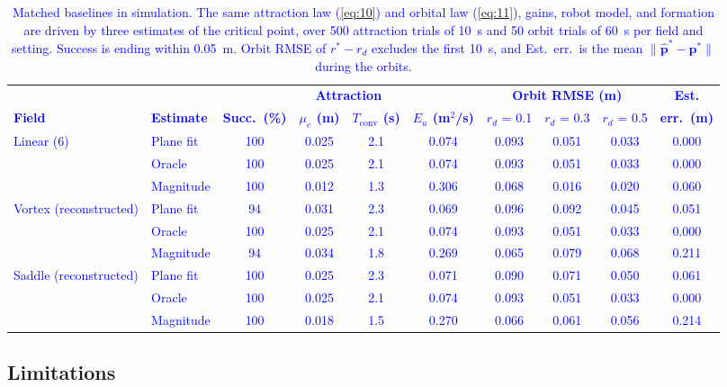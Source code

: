 \documentclass[lettersize,journal]{IEEEtran}
\newcommand{\rev}[1]{\textcolor{blue}{#1}}           %
\begin{document}
\begin{table}[!t]
\centering
\footnotesize
\caption{Matched baselines in simulation. The same attraction law (\ref{eq:10}) and orbital law (\ref{eq:11}), gains, robot model, and formation are driven by three estimates of the critical point, over 500 attraction trials of 10~s and 50 orbit trials of 60~s per field and setting. Success is ending within 0.05~m. Orbit RMSE of $r^* - r_d$ excludes the first 10~s, and Est.\ err.\ is the mean $\|\hat{\mathbf{p}}^* - \mathbf{p}^*\|$ during the orbits.}
\label{tab:baselines}
\setlength{\tabcolsep}{4pt}
\rev{\begin{tabular}{llcccc|ccc|c}
\hline
 & & \multicolumn{4}{c|}{\textbf{Attraction}} & \multicolumn{3}{c|}{\textbf{Orbit RMSE (m)}} & \textbf{Est.} \\
\textbf{Field} & \textbf{Estimate} & \textbf{Succ.\ (\%)} & \textbf{$\mu_e$ (m)} & \textbf{$T_{\mathrm{conv}}$ (s)} & \textbf{$E_u$ (m$^2$/s)} & $r_d$ = 0.1 & $r_d$ = 0.3 & $r_d$ = 0.5 & \textbf{err.\ (m)} \\
\hline
Linear (6) & Plane fit & 100 & 0.025 & 2.1 & 0.074 & 0.093 & 0.051 & 0.033 & 0.000 \\
 & Oracle & 100 & 0.025 & 2.1 & 0.074 & 0.093 & 0.051 & 0.033 & 0.000 \\
 & Magnitude & 100 & 0.012 & 1.3 & 0.306 & 0.068 & 0.016 & 0.020 & 0.060 \\
\hline
Vortex (reconstructed) & Plane fit & 94 & 0.031 & 2.3 & 0.069 & 0.096 & 0.092 & 0.045 & 0.051 \\
 & Oracle & 100 & 0.025 & 2.1 & 0.074 & 0.093 & 0.051 & 0.033 & 0.000 \\
 & Magnitude & 94 & 0.034 & 1.8 & 0.269 & 0.065 & 0.079 & 0.068 & 0.211 \\
\hline
Saddle (reconstructed) & Plane fit & 100 & 0.025 & 2.3 & 0.071 & 0.090 & 0.071 & 0.050 & 0.061 \\
 & Oracle & 100 & 0.025 & 2.1 & 0.074 & 0.093 & 0.051 & 0.033 & 0.000 \\
 & Magnitude & 100 & 0.018 & 1.5 & 0.270 & 0.066 & 0.061 & 0.056 & 0.214 \\
\hline
\end{tabular}} %
\end{table}

\subsection{Limitations}
\end{document}
